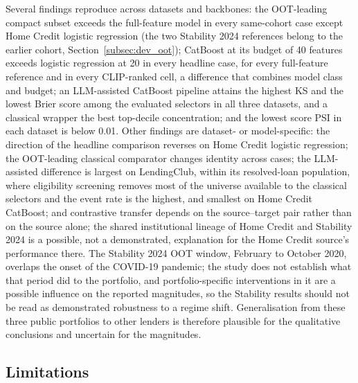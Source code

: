 \documentclass[final,5p,twocolumn]{elsarticle}
\begin{document}
Several findings reproduce across datasets and backbones: the OOT-leading compact subset exceeds the full-feature model in every same-cohort case except Home Credit logistic regression (the two Stability 2024 references belong to the earlier cohort, Section~\ref{subsec:dev_oot}); CatBoost at its budget of 40 features exceeds logistic regression at 20 in every headline case, for every full-feature reference and in every CLIP-ranked cell, a difference that combines model class and budget; an LLM-assisted CatBoost pipeline attains the highest KS and the lowest Brier score among the evaluated selectors in all three datasets, and a classical wrapper the best top-decile concentration; and the lowest score PSI in each dataset is below 0.01. Other findings are dataset- or model-specific: the direction of the headline comparison reverses on Home Credit logistic regression; the OOT-leading classical comparator changes identity across cases; the LLM-assisted difference is largest on LendingClub, within its resolved-loan population, where eligibility screening removes most of the universe available to the classical selectors and the event rate is the highest, and smallest on Home Credit CatBoost; and contrastive transfer depends on the source--target pair rather than on the source alone; the shared institutional lineage of Home Credit and Stability 2024 is a possible, not a demonstrated, explanation for the Home Credit source's performance there. The Stability 2024 OOT window, February to October 2020, overlaps the onset of the COVID-19 pandemic; the study does not establish what that period did to the portfolio, and portfolio-specific interventions in it are a possible influence on the reported magnitudes, so the Stability results should not be read as demonstrated robustness to a regime shift. Generalisation from these three public portfolios to other lenders is therefore plausible for the qualitative conclusions and uncertain for the magnitudes.

\subsection{Limitations}
\label{subsec:limitations}
\end{document}
